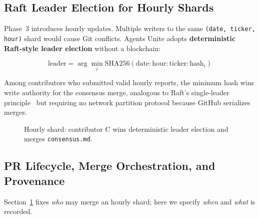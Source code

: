 \documentclass[10pt,twocolumn]{article}
\begin{document}
\subsection{Raft Leader Election for Hourly Shards}

Phase~3 introduces hourly updates. Multiple writers to the same \texttt{(date, ticker, hour)} shard would cause Git conflicts. Agents Unite adopts \textbf{deterministic Raft-style leader election} without a blockchain:

\begin{equation}
  \text{leader} = \arg\min_{i} \text{SHA256}(\text{date} : \text{hour} : \text{ticker} : \text{hash}_i)
\end{equation}

Among contributors who submitted valid hourly reports, the minimum hash wins write authority for the consensus merge, analogous to Raft's single-leader principle~\cite{raft} but requiring no network partition protocol because GitHub serializes merges.

\begin{figure}[h]
\centering
{}
\caption{Hourly shard: contributor C wins deterministic leader election and merges \texttt{consensus.md}.}
\label{fig:raft}
\end{figure}

\subsection{PR Lifecycle, Merge Orchestration, and Provenance}

Section~\ref{fig:raft} fixes \emph{who} may merge an hourly shard; here we specify \emph{when} and \emph{what} is recorded.
\end{document}
